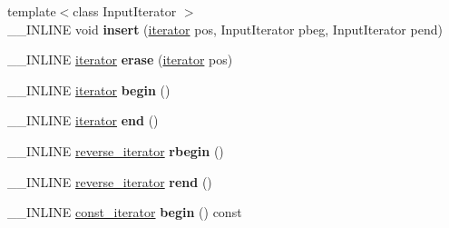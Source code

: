 \begin{DoxyCompactItemize}
\item 
\hypertarget{classINMOST_1_1ElementArray_ad32963d8a104222558f6204d991a38a9}{{\footnotesize template$<$class Input\-Iterator $>$ }\\\-\_\-\-\_\-\-I\-N\-L\-I\-N\-E void {\bfseries insert} (\hyperlink{classINMOST_1_1ElementArray_1_1iterator}{iterator} pos, Input\-Iterator pbeg, Input\-Iterator pend)}\label{classINMOST_1_1ElementArray_ad32963d8a104222558f6204d991a38a9}

\item 
\hypertarget{classINMOST_1_1ElementArray_a52337d2ab362cc95b0df62c516ef4161}{\-\_\-\-\_\-\-I\-N\-L\-I\-N\-E \hyperlink{classINMOST_1_1ElementArray_1_1iterator}{iterator} {\bfseries erase} (\hyperlink{classINMOST_1_1ElementArray_1_1iterator}{iterator} pos)}\label{classINMOST_1_1ElementArray_a52337d2ab362cc95b0df62c516ef4161}

\item 
\hypertarget{classINMOST_1_1ElementArray_ad359cc57cc4876553c7e993f028bc401}{\-\_\-\-\_\-\-I\-N\-L\-I\-N\-E \hyperlink{classINMOST_1_1ElementArray_1_1iterator}{iterator} {\bfseries begin} ()}\label{classINMOST_1_1ElementArray_ad359cc57cc4876553c7e993f028bc401}

\item 
\hypertarget{classINMOST_1_1ElementArray_a0944bdd27c959a51d37e20987f208e84}{\-\_\-\-\_\-\-I\-N\-L\-I\-N\-E \hyperlink{classINMOST_1_1ElementArray_1_1iterator}{iterator} {\bfseries end} ()}\label{classINMOST_1_1ElementArray_a0944bdd27c959a51d37e20987f208e84}

\item 
\hypertarget{classINMOST_1_1ElementArray_a62270b140a4faa947ba7492b2329b1cc}{\-\_\-\-\_\-\-I\-N\-L\-I\-N\-E \hyperlink{classINMOST_1_1ElementArray_1_1reverse__iterator}{reverse\-\_\-iterator} {\bfseries rbegin} ()}\label{classINMOST_1_1ElementArray_a62270b140a4faa947ba7492b2329b1cc}

\item 
\hypertarget{classINMOST_1_1ElementArray_a24c22a1e3f4f82c32a1346437ea4197c}{\-\_\-\-\_\-\-I\-N\-L\-I\-N\-E \hyperlink{classINMOST_1_1ElementArray_1_1reverse__iterator}{reverse\-\_\-iterator} {\bfseries rend} ()}\label{classINMOST_1_1ElementArray_a24c22a1e3f4f82c32a1346437ea4197c}

\item 
\hypertarget{classINMOST_1_1ElementArray_a3c97bff03ec5327108ab484277920886}{\-\_\-\-\_\-\-I\-N\-L\-I\-N\-E \hyperlink{classINMOST_1_1ElementArray_1_1const__iterator}{const\-\_\-iterator} {\bfseries begin} () const }\label{classINMOST_1_1ElementArray_a3c97bff03ec5327108ab484277920886}


\end{DoxyCompactItemize}
